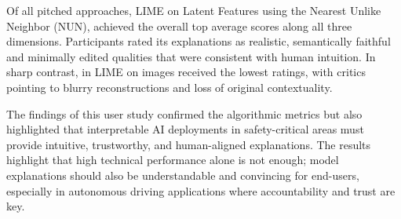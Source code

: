 Of all pitched approaches, LIME on Latent Features using the Nearest Unlike Neighbor (NUN), achieved the overall top average scores along all three dimensions. Participants rated its explanations as realistic, semantically faithful and minimally edited qualities that were consistent with human intuition. In sharp contrast, in  LIME on images received the lowest ratings, with critics pointing to blurry reconstructions and loss of original contextuality.

The findings of this user study confirmed the algorithmic metrics but also highlighted that interpretable AI deployments in safety-critical areas must provide intuitive, trustworthy, and human-aligned explanations. The results highlight that high technical performance alone is not enough; model explanations should also be understandable and convincing for end-users, especially in autonomous driving applications where accountability and trust are key.

